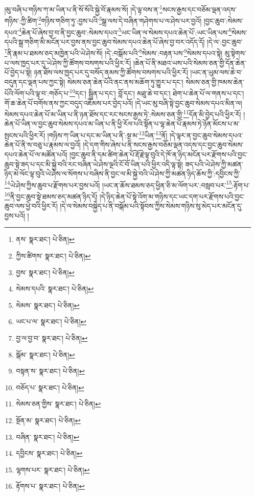 །མུ་བཞི་པ་གཉིས་ཀ་མ་ཡིན་པ་ནི་སོ་སོའི་སྐྱེ་བོ་རྣམས་སོ། །དེ་ལྟ་བས་ན་\footnote{ནས་  སྣར་ཐང་།  པེ་ཅིན། }སངས་རྒྱས་དང་བཅོམ་ལྡན་འདས་གཉིས་:ཀྱི་ཚིག་\footnote{ཀྱིས་ཚིགས་  སྣར་ཐང་།  པེ་ཅིན། }གཉིས་གཅིག་ཏུ་:བྱས་པའི་\footnote{བྱས་  སྣར་ཐང་།  པེ་ཅིན། }སྒྲ་ལས་དེ་བཞིན་གཤེགས་པ་ལ་ཤེས་པར་བྱའོ། །བྱང་ཆུབ་:སེམས་དཔའ་\footnote{སེམས་དཔའི་  སྣར་ཐང་།  པེ་ཅིན། }ཆེན་པོ་ཞེས་བྱ་བ་ནི་བྱང་ཆུབ་:སེམས་དཔའ་\footnote{སེམས་  སྣར་ཐང་།  པེ་ཅིན། }ཡང་ཡིན་ལ་སེམས་དཔའ་ཆེན་པོ་:ཡང་ཡིན་པས་\footnote{ཡང་པ་ལ་  སྣར་ཐང་།  པེ་ཅིན། }སེམས་དཔའི་སྒྲ་གཅིག་མི་མངོན་པར་བྱས་ནས་བྱང་ཆུབ་སེམས་དཔའ་ཆེན་པོ་ཞེས་བྱ་བར་འདོད་དོ། །དེ་ལ་:བྱང་ཆུབ་\footnote{བྱ་ལ་བྱ་བ་  སྣར་ཐང་།  པེ་ཅིན། }ནི་རྣམ་པ་ཐམས་ཅད་མཁྱེན་པའི་ཡེ་ཤེས་སོ། །དེ་:བསྒོམ་པའི་\footnote{སྒོམ་  སྣར་ཐང་།  པེ་ཅིན། }སེམས་:བརྟན་པས་\footnote{བསྟན་ས་  སྣར་ཐང་།  པེ་ཅིན། }སེམས་དཔའ་སྟེ། མུ་སྟེགས་པ་ལས་ཁྱད་པར་དུ་ཡེ་ཤེས་ཀྱི་ཚོགས་བསགས་པའི་ཕྱིར་རོ། །ཆེན་པོ་ནི་མཐའ་ཡས་པའི་སེམས་ཅན་གྱི་དོན་ཆེན་པོ་བྱེད་པ་སྟེ། ཉན་ཐོས་ལས་ཁྱད་པར་དུ་བསོད་ནམས་ཀྱི་ཚོགས་བསགས་པའི་ཕྱིར་རོ། །ཡང་ན་ཡུམ་ལས་ཆེ་བ་བདུན་དང་ལྡན་པས་ཀྱང་སྟེ། སེམས་ཅན་ཆེན་པོའི་ནང་ནས་མཆོག་ཏུ་གྱུར་པ་དང་། སེམས་ཅན་གྱི་ཁམས་ཆེན་པོའི་ལོག་པའི་ལྟ་བ་:གཅོད་པ་\footnote{བཅོད་པ་  སྣར་ཐང་།  པེ་ཅིན། }དང་། སྦྱིན་པ་དང་། བློ་དང་། མཐུ་ཆེ་བ་དང་། ཐེག་པ་ཆེན་པོ་ལ་གནས་པ་དང་། གོ་ཆ་ཆེན་པོ་བགོས་ནས་ཀྱང་བདུད་འཇོམས་པར་བྱེད་པའོ། །དེ་ཡང་མུ་བཞི་སྟེ་བྱང་ཆུབ་སེམས་དཔའ་མིན་ལ། སེམས་དཔའ་ཆེན་པོ་མ་ཡིན་པ་ནི་ཉན་ཐོས་དང་རང་སངས་རྒྱས་ཏེ་:སེམས་ཅན་གྱི་\footnote{སེམས་ཅན་གྱིས་  སྣར་ཐང་།  པེ་ཅིན། }དོན་མི་བྱེད་པའི་ཕྱིར་རོ། །ཆེན་པོ་ཡིན་ལ་བྱང་ཆུབ་སེམས་དཔའ་མ་ཡིན་པ་ནི་ཕྱི་རོལ་པའི་སྟོན་པ་ལྷ་ཆེན་པོ་རྣམས་ཏེ་ཉོན་མོངས་པ་མ་སྤངས་པའི་ཕྱིར་རོ། །གཉིས་ཀ་ཡིན་པ་དང་མ་ཡིན་པ་ནི་:སྔ་མ་\footnote{སྔོན་མ་  སྣར་ཐང་།  པེ་ཅིན། }ཡིན་\footnote{བཞིན་  སྣར་ཐང་།  པེ་ཅིན། }ནོ། །དེ་ལྟར་ན་བྱང་ཆུབ་སེམས་དཔའ་ཆེན་པོ་ནི་ས་བཅུ་པ་རྣམས་ལ་བྱའོ། །དེ་དག་གིས་ཞེས་པ་ནི་སངས་རྒྱས་བཅོམ་ལྡན་འདས་དང་བྱང་ཆུབ་སེམས་དཔའ་ཆེན་པོ་ལ་མཚོན་པའོ། །བྱང་ཆུབ་ནི་དམ་ཚིག་ཆེན་པོ་རྡོ་རྗེ་ལྟ་བུའི་དེ་ཁོ་ན་ཉིད་མངོན་པར་རྫོགས་པའི་བྱང་ཆུབ་སྟེ་ཟད་པ་དང་མི་སྐྱེ་བའི་རང་བཞིན་ཡེ་ཤེས་ལྔའི་ངོ་བོ་ཡིན་པའི་ཕྱིར་འདི་ལྟ་སྟེ། ཟད་པའི་ཡེ་ཤེས་ཀྱི་མཚན་ཉིད་མེ་ལོང་ལྟ་བུའི་ཡེ་ཤེས་ལ་སོགས་པ་བཞིས་ནི་བྱང་ལ་མི་སྐྱེ་བའི་ཡེ་ཤེས་ཀྱི་མཚན་ཉིད་ཆོས་ཀྱི་:དབྱིངས་ཀྱི་\footnote{དབྱིངས་  སྣར་ཐང་།  པེ་ཅིན། }ཡེ་ཤེས་ཀྱིས་ཆུབ་པ་རྫོགས་པར་བྱས་པའོ། །ཡང་ན་ཆོས་ཐམས་ཅད་ཕྱིན་ཅི་མ་ལོག་པར་:བསླབ་པར་\footnote{ལྷགས་པར་  སྣར་ཐང་།  པེ་ཅིན། }:རྟོག་པ་\footnote{རྟོགས་པ་  སྣར་ཐང་།  པེ་ཅིན། }ནི་བྱང་ཆུབ་སྟེ་ཐམས་ཅད་མཚན་ཉིད་དོ། །དེ་ཉིད་ཆེན་པོ་སྟེ་འོག་མ་གཉིས་དང་ཡང་དག་པར་རྫོགས་པའི་བྱང་ཆུབ་ལས་ཕྱེ་བའི་ཕྱིར་རོ། །དེ་ལ་སེམས་བསྐྱེད་པ་ནི་བསྒོམ་པའི་སྟོབས་ཀྱིས་སེམས་གཉིས་སུ་མེད་པར་མངོན་དུ་བྱས་པའོ། །
